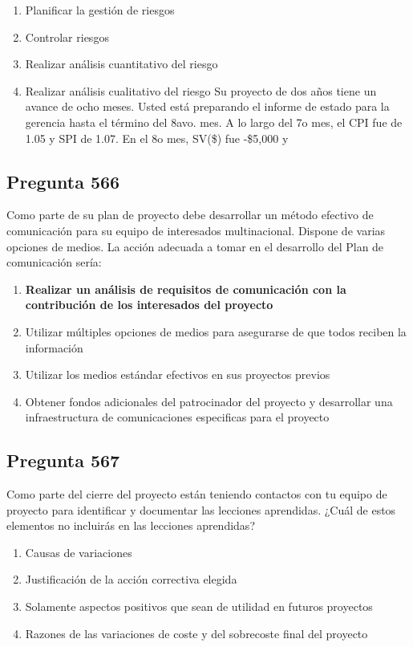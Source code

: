 \documentclass[11pt,a4paper]{article}
\begin{document}
\begin{enumerate}[label=\alph*)]
  \item Planificar la gestión de riesgos
  \item Controlar riesgos
  \item Realizar análisis cuantitativo del riesgo
  \item Realizar análisis cualitativo del riesgo Su proyecto de dos años tiene un avance de ocho meses. Usted está preparando el informe de estado para la gerencia hasta el término del 8avo. mes. A lo largo del 7o mes, el CPI fue de 1.05 y SPI de 1.07. En el 8o mes, SV(\$) fue -\$5,000 y
\end{enumerate}

\subsection*{Pregunta 566}
Como parte de su plan de proyecto debe desarrollar un método efectivo de comunicación para su equipo de interesados multinacional. Dispone de varias opciones de medios. La acción adecuada a tomar en el desarrollo del Plan de comunicación sería:

\begin{enumerate}[label=\alph*)]
  \item \textbf{Realizar un análisis de requisitos de comunicación con la contribución de los interesados del proyecto}
  \item Utilizar múltiples opciones de medios para asegurarse de que todos reciben la información
  \item Utilizar los medios estándar efectivos en sus proyectos previos
  \item Obtener fondos adicionales del patrocinador del proyecto y desarrollar una infraestructura de comunicaciones especificas para el proyecto
\end{enumerate}

\subsection*{Pregunta 567}
Como parte del cierre del proyecto están teniendo contactos con tu equipo de proyecto para identificar y documentar las lecciones aprendidas. ¿Cuál de estos elementos no incluirás en las lecciones aprendidas?

\begin{enumerate}[label=\alph*)]
  \item Causas de variaciones
  \item Justificación de la acción correctiva elegida
  \item Solamente aspectos positivos que sean de utilidad en futuros proyectos
  \item Razones de las variaciones de coste y del sobrecoste final del proyecto
\end{enumerate}
\end{document}
